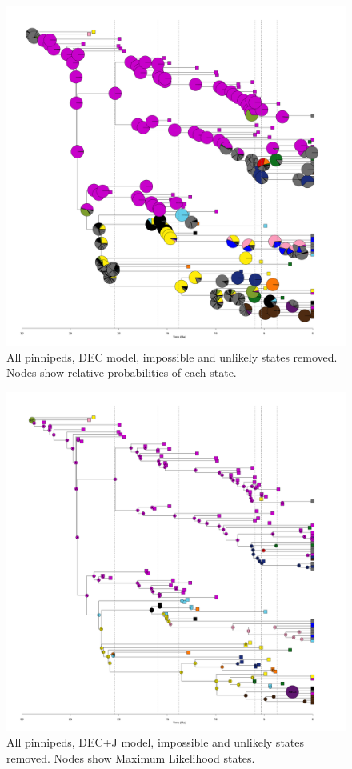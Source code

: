 \documentclass[a4paper, 12pt]{article}
\begin{document}
\begin{figure}[H]
 \centering
  \includegraphics[width = \linewidth]{figures/all-pinnipeds-DEC-unlikely-pies.png}
  \caption{All pinnipeds, DEC model, impossible and unlikely states removed. Nodes show relative probabilities of each state.}
  \label{fig-all-dec-pie-unlikely}
\end{figure} 

\begin{figure}[H]
 \centering
  \includegraphics[width = \linewidth]{figures/all-pinnipeds-DECj-unlikely-MLstates.png}
  \caption{All pinnipeds, DEC+J model, impossible and unlikely states removed. Nodes show Maximum Likelihood states.}
  \label{fig-all-decj-ml-unlikely}
\end{figure} 
\end{document}

